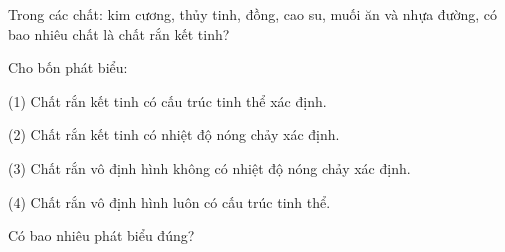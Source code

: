 
\begin{bt}
Trong các chất: kim cương, thủy tinh, đồng, cao su, muối ăn và nhựa đường, có bao nhiêu chất là chất rắn kết tinh?
\end{bt}

\begin{bt}
\end{bt}



\begin{bt}
Cho bốn phát biểu:

(1) Chất rắn kết tinh có cấu trúc tinh thể xác định.

(2) Chất rắn kết tinh có nhiệt độ nóng chảy xác định.

(3) Chất rắn vô định hình không có nhiệt độ nóng chảy xác định.

(4) Chất rắn vô định hình luôn có cấu trúc tinh thể.

Có bao nhiêu phát biểu đúng?
\end{bt}


